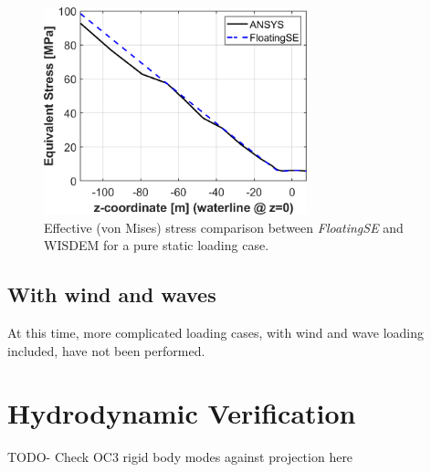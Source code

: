 \begin{figure}[htb]
  \begin{center}
    \includegraphics[width=3in]{figs/oc3-verification_equivalentstress.png}
    \caption{Effective (von Mises) stress comparison between
      \textit{FloatingSE} and WISDEM for a pure static loading case.}
    \label{fig:verify}
  \end{center}
\end{figure}

\subsection{With wind and waves}
At this time, more complicated loading cases, with wind and wave loading
included, have not been performed.

\section{Hydrodynamic Verification}
TODO- Check OC3 rigid body modes against projection here

